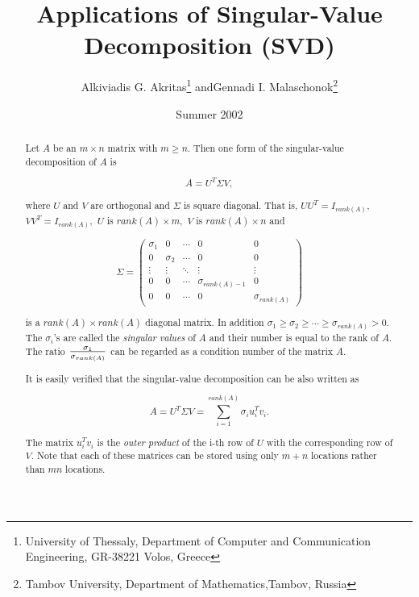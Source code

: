 \documentclass[12pt,a4paper]{article}
\begin{document}
\title{Applications of Singular-Value Decomposition (SVD) }

\author{Alkiviadis G. Akritas\footnote{University of Thessaly, Department of
  Computer and Communication Engineering, GR-38221 Volos,
  Greece}\hspace{.1in} and\hspace{.1in}Gennadi I. Malaschonok\footnote{Tambov University,
  Department of Mathematics,Tambov, Russia}}

\date{Summer 2002}
\maketitle

\begin{abstract}
Let $A$ be an $m \times n$ matrix with $m \geq n$. Then one form
of the singular-value decomposition of $A$ is

$$ A = U^T \Sigma V,$$

where $U$ and $V$ are orthogonal and $\Sigma$ is square diagonal.
That is, $UU^T=I_{rank(A)},$ $VV^T=I_{rank(A)},$ $U$ is $rank(A)
\times m,$ $V$ is $rank(A) \times n$ and

$$ \Sigma = \left(\begin{array}{ccccc}  \sigma_1&0&\cdots&0&0\\
                                                                 0&\sigma_2&\cdots&0&0\\
                                                                 \vdots&\vdots&\ddots&\vdots&\vdots\\
                                                                 0&0&\cdots&\sigma_{rank(A)-1}&0\\
                                                                 0&0&\cdots&0&\sigma_{rank(A)}
\end{array}\right)  $$

is a $rank(A) \times rank(A)$ diagonal matrix.  In addition
$\sigma_1\geq \sigma_2\geq \cdots \geq \sigma_{rank(A)} >  0.$ The
$\sigma_i$'s are called the {\em singular values} of $A$ and their
number is equal to the rank of $A$.  The ratio $\sigma_1 \over
\sigma_{rank(A)} $ can be regarded as a condition number of the
matrix $A$.

It is easily verified that the singular-value decomposition can be
also written as

$$ A = U^T \Sigma V = \sum_{i=1}^{rank(A)} \sigma_i u_i^T v_i.$$

The matrix $ u_i^T v_i$ is the {\em outer product} of the i-th row
of $U$ with the corresponding row of $V$.  Note that each of these
matrices can be stored using only $m+n$ locations rather than $mn$
locations.



\end{abstract}
\end{document}
